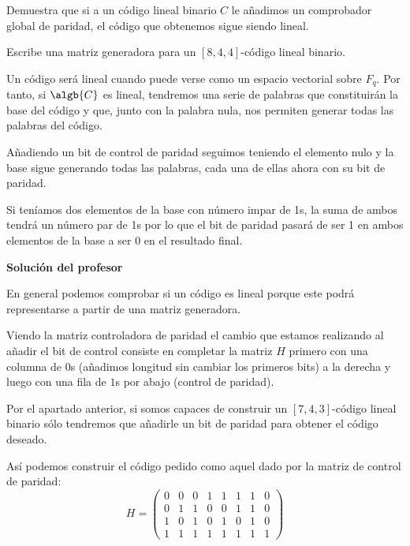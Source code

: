 \begin{problem}[13]
\ppart Demuestra que si a un código lineal binario $C$
le añadimos un comprobador global de paridad, el código que
obtenemos sigue siendo lineal.

\ppart Escribe una matriz generadora para un $[8,4,4]$-código lineal
binario.

\solution

\spart


Un código será lineal cuando puede verse como un espacio vectorial sobre $F_q$. Por tanto, si $\algb{C}$ es lineal, tendremos una serie de palabras que constituirán la base del código y que, junto con la palabra nula, nos permiten generar todas las palabras del código.

Añadiendo un bit de control de paridad seguimos teniendo el elemento nulo y la base sigue generando todas las palabras, cada una de ellas ahora con su bit de paridad.

Si teníamos dos elementos de la base con número impar de 1s, la suma de ambos tendrá un número par de 1s por lo que el bit de paridad pasará de ser 1 en ambos elementos de la base a ser 0 en el resultado final.

\textbf{Solución del profesor}

En general podemos comprobar si un código es lineal porque este podrá representarse a partir de una matriz generadora.

Viendo la matriz controladora de paridad el cambio que estamos realizando al añadir el bit de control consiste en completar la matriz $H$ primero con una columna de $0$s (añadimos longitud sin cambiar los primeros bits) a la derecha y luego con una fila de $1$s por abajo (control de paridad).

\spart

Por el apartado anterior, si somos capaces de construir un $[7,4,3]$-código lineal binario sólo tendremos que añadirle un bit de paridad para obtener el código deseado.

Así podemos construir el código pedido como aquel dado por la matriz de control de paridad:
\[H = \left( \begin{array}{ccccccc|c}
0 & 0 & 0 & 1 & 1 & 1 & 1 & 0 \\
0 & 1 & 1 & 0 & 0 & 1 & 1 & 0 \\
1 & 0 & 1 & 0 & 1 & 0 & 1 & 0 \\
\hline
1 & 1 & 1 & 1 & 1 & 1 & 1 & 1
\end{array}\right)\]

\end{problem}

